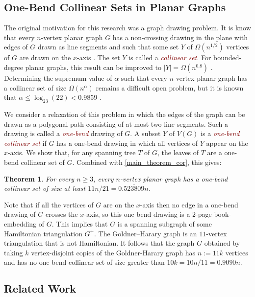 \documentclass{article}
\newtheorem{thm}{Theorem}
\newcommand{\defin}[1]{\emph{\textcolor{Maroon}{#1}}}
\theoremstyle{definition}
\begin{document}
\subsection{One-Bend Collinear Sets in Planar Graphs}


The original motivation for this research was a graph drawing problem.  It is know that every $n$-vertex planar graph $G$ has a non-crossing drawing in the plane with edges of $G$ drawn as line segments and such that some set $Y$ of $\Omega(n^{1/2})$ vertices of $G$ are drawn on the $x$-axis \cite{bose.dujmovic:polynomial,dujmovic:utility}.  The set $Y$ is called a \defin{collinear set}.  For bounded-degree planar graphs, this result can be improved to $|Y|=\Omega(n^{0.8})$ \cite{dujmovic.morin:dual}.  Determining the supremum value of $\alpha$ such that every $n$-vertex planar graph has a collinear set of size $\Omega(n^{\alpha})$ remains a difficult open problem, but it is known that $\alpha \le \log_{23}(22)<0.9859$ \cite{ravsky.verbitsky:collinear}.

We consider a relaxation of this problem in which the edges of the graph can be drawn as a polygonal path consisting of at most two line segments.  Such a drawing is called a \defin{one-bend} drawing of $G$.  A subset $Y$ of $V(G)$ is a \defin{one-bend collinear set} if $G$ has a one-bend drawing in which all vertices of $Y$ appear on the $x$-axis.  We show that, for any spanning tree $T$ of $G$, the leaves of $T$ are a one-bend collinear set of $G$.  Combined with \cref{main_theorem_cor}, this gives:

\begin{thm}\label{one_bend_collinear_thm}
  For every $n\ge 3$, every $n$-vertex planar graph has a one-bend collinear set of size at least $11n/21=0.\overline{523809}n$.
\end{thm}

Note that if all the vertices of $G$ are on the $x$-axis then no edge in a one-bend drawing of $G$ crosses the $x$-axis, so this one bend drawing is a $2$-page book-embedding of $G$. This implies that $G$ is a spanning subgraph of some Hamiltonian triangulation $G^+$.  The Goldner–Harary graph is an $11$-vertex triangulation that is not Hamiltonian. It follows that the graph $G$ obtained by taking $k$ vertex-disjoint copies of the Goldner-Harary graph has $n:=11k$ vertices and has no one-bend collinear set of size greater than $10k=10n/11=0.90\overline{90}n$.

\subsection{Related Work}
\end{document}
